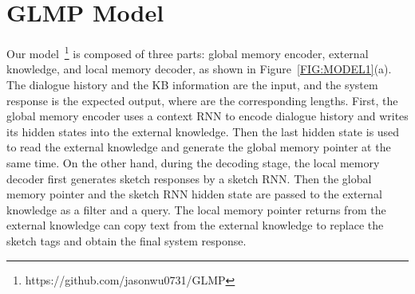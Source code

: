 \documentclass{article} \usepackage{iclr2019_conference,times}
\begin{document}
\begin{table}[t]
\setlength{\abovecaptionskip}{-1pt} 
\caption{An in-car assistant example on the navigation domain. The left part is the KB information and the right part is the conversation between a driver and our system.}
\label{TB:EXAMPLE}
\begin{center}
\end{center}
\vspace{-1.0\baselineskip}
\end{table}

\section{GLMP Model}
Our model~\footnote{https://github.com/jasonwu0731/GLMP} is composed of three parts: global memory encoder, external knowledge, and local memory decoder, as shown in Figure~\ref{FIG:MODEL1}(a). The dialogue history  and the KB information  are the input, and the system response  is the expected output, where  are the corresponding lengths. First, the global memory encoder uses a context RNN to encode dialogue history and writes its hidden states into the external knowledge. Then the last hidden state is used to read the external knowledge and generate the global memory pointer at the same time. On the other hand, during the decoding stage, the local memory decoder first generates sketch responses by a sketch RNN. Then the global memory pointer and the sketch RNN hidden state are passed to the external knowledge as a filter and a query. The local memory pointer returns from the external knowledge can copy text from the external knowledge to replace the sketch tags and obtain the final system response.
\end{document}
